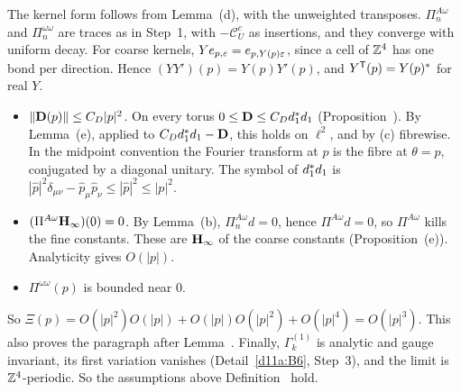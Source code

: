 \begin{detail}
\begin{step}[(b)]
\end{step}
\begin{step}
The kernel form follows from Lemma~(d), with the unweighted transposes. $\Pi^{A\omega}_n$ and $\Pi^{\omega\omega}_n$ are traces as in Step~1, with $-\mathcal C^c_U$ as insertions, and they converge with uniform decay. For coarse kernels, $Ye_{p,\varepsilon}=e_{p,Y(p)\varepsilon}$, since a cell of $\mathbb Z^4$ has one bond per direction. Hence $(YY')(p)=Y(p)Y'(p)$, and $Y^{\sf T}(p)=Y(p)^*$ for real $Y$.
\begin{itemize}
\item $\|\mathbf D(p)\|\le C_D|p|^2$. On every torus $0\le\mathbf D\le C_Dd_1^*d_1$ (Proposition~). By Lemma~(e), applied to $C_Dd_1^*d_1-\mathbf D$, this holds on $\ell^2$, and by (c) fibrewise. In the midpoint convention the Fourier transform at $p$ is the fibre at $\theta=p$, conjugated by a diagonal unitary. The symbol of $d_1^*d_1$ is $|\hat p|^2\delta_{\mu\nu}-\hat p_\mu\hat p_\nu\le|\hat p|^2\le|p|^2$.
\item $(\Pi^{A\omega}\mathbf H_\infty)(0)=0$. By Lemma~(b), $\Pi^{A\omega}_nd=0$, hence $\Pi^{A\omega}d=0$, so $\Pi^{A\omega}$ kills the fine constants. These are $\mathbf H_\infty$ of the coarse constants (Proposition~(e)). Analyticity gives $O(|p|)$.
\item $\Pi^{\omega\omega}(p)$ is bounded near $0$.
\end{itemize}
So $\Xi(p)=O(|p|^2)O(|p|)+O(|p|)O(|p|^2)+O(|p|^4)=O(|p|^3)$. This also proves the paragraph after Lemma~. Finally, $\Gamma^{(1)}_k$ is analytic and gauge invariant, its first variation vanishes (Detail~\ref{d11a:B6}, Step~3), and the limit is $\mathbb Z^4$-periodic. So the assumptions above Definition~ hold.
\end{step}
\end{detail}

